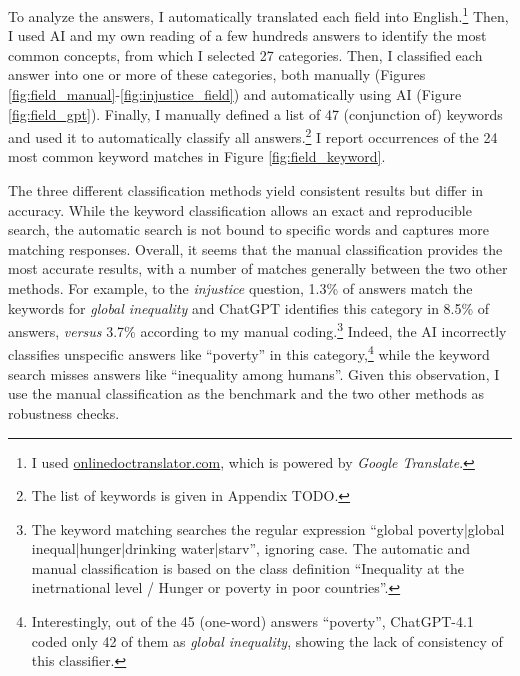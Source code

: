 \documentclass[12pt,english]{article}
\begin{document}
\begin{bibunit}
To analyze the answers, I automatically translated each field into English.\footnote{I used \href{https://www.onlinedoctranslator.com/en/translationform}{onlinedoctranslator.com}, which is powered by \textit{Google Translate}.} Then, I used AI and my own reading of a few hundreds answers to identify the most common concepts, from which I selected 27 categories. Then, I classified each answer into one or more of these categories, both manually (Figures \ref{fig:field_manual}-\ref{fig:injustice_field}) and automatically using AI (Figure \ref{fig:field_gpt}). Finally, I manually defined a list of 47 (conjunction of) keywords and used it to automatically classify all answers.\footnote{The list of keywords is given in Appendix TODO.} I report occurrences of the 24 most common keyword matches in Figure \ref{fig:field_keyword}. 

The three different classification methods yield consistent results but differ in accuracy. While the keyword classification allows an exact and reproducible search, the automatic search is not bound to specific words and captures more matching responses. %
Overall, it seems that the manual classification provides the most accurate results, with a number of matches generally between the two other methods. 
For example, to the \textit{injustice} question, 1.3\% of answers match the keywords for \textit{global inequality} and ChatGPT identifies this category in 8.5\% of answers, \textit{versus} 3.7\% according to my manual coding.\footnote{The keyword matching searches the regular expression ``global poverty|global inequal|hunger|drinking water|starv'', ignoring case. The automatic and manual classification is based on the class definition ``Inequality at the inetrnational level / Hunger or poverty in poor countries''.} 
Indeed, the AI incorrectly classifies unspecific answers like ``poverty'' in this category,\footnote{Interestingly, out of the 45 (one-word) answers ``poverty'', ChatGPT-4.1 coded only 42 of them as \textit{global inequality}, showing the lack of consistency of this classifier.} while the keyword search misses answers like ``inequality among humans''. 
Given this observation, I use the manual classification as the benchmark and the two other methods as robustness checks.


\end{bibunit}
\end{document}
